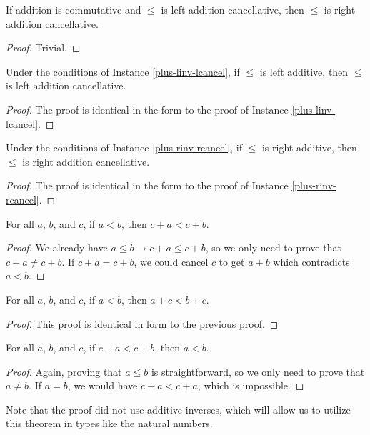 \documentclass[../math.tex]{subfiles}
\begin{document}
\begin{instance}
    If addition is commutative and $\leq$ is left addition cancellative, then
    $\leq$ is right addition cancellative.
\end{instance}
\begin{proof}
    Trivial.
\end{proof}

\begin{instance}
    Under the conditions of Instance \ref{plus-linv-lcancel}, if $\leq$ is left
    additive, then $\leq$ is left addition cancellative.
\end{instance}
\begin{proof}
    The proof is identical in the form to the proof of Instance
    \ref{plus-linv-lcancel}.
\end{proof}

\begin{instance}
    Under the conditions of Instance \ref{plus-rinv-rcancel}, if $\leq$ is right
    additive, then $\leq$ is right addition cancellative.
\end{instance}
\begin{proof}
    The proof is identical in the form to the proof of Instance
    \ref{plus-rinv-rcancel}.
\end{proof}

\begin{theorem}
    For all $a$, $b$, and $c$, if $a < b$, then $c + a < c + b$.
\end{theorem}
\begin{proof}
    We already have $a \leq b \rightarrow c + a \leq c + b$, so we only need to
    prove that $c + a \neq c + b$.  If $c + a = c + b$, we could cancel $c$ to
    get $a + b$ which contradicts $a < b$.
\end{proof}

\begin{theorem}
    For all $a$, $b$, and $c$, if $a < b$, then $a + c < b + c$.
\end{theorem}
\begin{proof}
    This proof is identical in form to the previous proof.
\end{proof}

\begin{theorem}
    For all $a$, $b$, and $c$, if $c + a < c + b$, then $a < b$.
\end{theorem}
\begin{proof}
    Again, proving that $a \leq b$ is straightforward, so we only need to prove
    that $a \neq b$.  If $a = b$, we would have $c + a < c + a$, which is
    impossible.
\end{proof}
\noindent Note that the proof did not use additive inverses, which will allow us
to utilize this theorem in types like the natural numbers.
\end{document}
